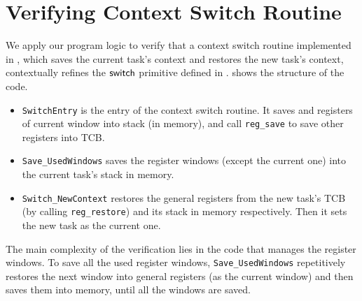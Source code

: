 \section{Verifying Context Switch Routine}
\label{sec:ctxswitch}

\indent
We apply our program logic to verify
that a context switch routine implemented in \sparc,
which saves the current task's context and 
restores the new task's context, 
contextually refines the $\mathsf{switch}{}$ primitive 
defined in \Sec{\ref{subsec:High-level Pseudo-SPARCv8 Language}}. 
\Fig{\ref{fig:The Structure of Context Switch Routine}}
shows the structure of the code.
\begin{center}
    
	\label{fig:The Structure of Context Switch Routine}
\end{center}
\begin{itemize}
    \item \texttt{SwitchEntry}
    is the entry of the context switch routine. 
    It saves \localRN{} and \inRN{} registers of current
    window into stack (in memory), and call 
    \texttt{reg\_save} to save other registers into TCB.
    
    \item
    \texttt{Save\_UsedWindows} saves
	the register windows (except the current one)
    into the current task's stack in memory. 

    \item     
    \texttt{Switch\_NewContext}
    restores the general registers from the new task's TCB 
    (by calling \texttt{reg\_restore})
    and its stack in memory 
    respectively. Then it sets the new task as
    the current one.
\end{itemize}

The main complexity of the verification lies in
the code that manages the register windows.
To save all the used 
register windows, \texttt{Save\_UsedWindows}
repetitively restores the next window into general registers
(as the current window)
and then saves them into memory, until all the windows are saved.

